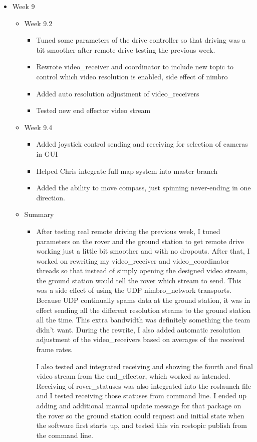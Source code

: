 \begin{itemize}
\item Week 9
	\begin{itemize}
	\item Week 9.2
      \begin{itemize}
      \item Tuned some parameters of the drive controller so that driving was a bit smoother after remote drive testing the previous week. 
      \item Rewrote video\_receiver and coordinator to include new topic to control which video resolution is enabled, side effect of nimbro 
      \item Added auto resolution adjustment of video\_receivers 
      \item Tested new end effector video stream 
      \end{itemize}
	\item Week 9.4
      \begin{itemize}
      \item Added joystick control sending and receiving for selection of cameras in GUI 
      \item Helped Chris integrate full map system into master branch 
      \item Added the ability to move compass, just spinning never-ending in one direction. 
      \end{itemize}
    
    \item Summary
      \begin{itemize}
      \item After testing real remote driving the previous week, I tuned parameters on the rover and the ground station to get remote drive working just a little bit smoother and with no dropouts. After that, I worked on rewriting my video\_receiver and video\_coordinator threads so that instead of simply opening the designed video stream, the ground station would tell the rover which stream to send. This was a side effect of using the UDP nimbro\_network transports. Because UDP continually spams data at the ground station, it was in effect sending all the different resolution steams to the ground station all the time. This extra bandwidth was definitely something the team didn't want. During the rewrite, I also added automatic resolution adjustment of the video\_receivers based on averages of the received frame rates.  

I also tested and integrated receiving and showing the fourth and final video stream from the end\_effector, which worked as intended. Receiving of rover\_statuses was also integrated into the roslaunch file and I tested receiving those statuses from command line. I ended up adding and additional manual update message for that package on the rover so the ground station could request and initial state when the software first starts up, and tested this via rostopic publish from the command line.  


\end{itemize}
\end{itemize}
\end{itemize}
